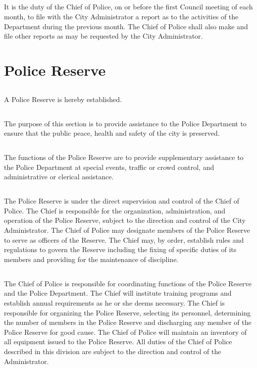 \subsection{}
It is the duty of the Chief of Police, on or before the first Council meeting of each month, to file with the City Administrator a report as to the activities of the Department during the previous month. The Chief of Police shall also make and file other reports as may be requested by the City Administrator.

\section{Police Reserve}
\subsection{}
A Police Reserve is hereby established.
\subsection{}
The purpose of this section is to provide assistance to the Police Department to ensure that the public peace, health and safety of the city is preserved.
\subsection{}
The functions of the Police Reserve are to provide supplementary assistance to the Police Department at special events, traffic or crowd control, and administrative or clerical assistance.
\subsection{}
The Police Reserve is under the direct supervision and control of the Chief of Police.  The Chief is responsible for the organization, administration, and operation of the Police Reserve, subject to the direction and control of the City Administrator. The Chief of Police may designate members of the Police Reserve to serve as officers of the Reserve. The Chief may, by order, establish rules and regulations to govern the Reserve including the fixing of specific duties of its members and providing for the maintenance of discipline.
\subsection{}
The Chief of Police is responsible for coordinating functions of the Police Reserve and the Police Department. The Chief will institute training programs and establish annual requirements as he or she deems necessary. The Chief is responsible for organizing the Police Reserve, selecting its personnel, determining the number of members in the Police Reserve and discharging any member of the Police Reserve for good cause. The Chief of Police will maintain an inventory of all equipment issued to the Police Reserve. All duties of the Chief of Police described in this division are subject to the direction and control of the Administrator.
